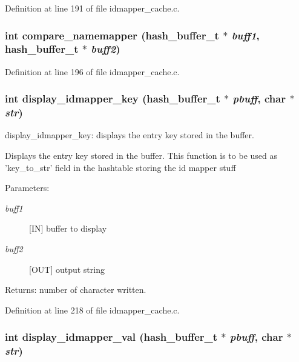 Definition at line 191 of file idmapper\_\-cache.c.
\subsubsection{\setlength{\rightskip}{0pt plus 5cm}int compare\_\-namemapper (hash\_\-buffer\_\-t $\ast$ {\em buff1}, hash\_\-buffer\_\-t $\ast$ {\em buff2})}\label{idmapper__cache_8c_a11}




Definition at line 196 of file idmapper\_\-cache.c.
\subsubsection{\setlength{\rightskip}{0pt plus 5cm}int display\_\-idmapper\_\-key (hash\_\-buffer\_\-t $\ast$ {\em pbuff}, char $\ast$ {\em str})}\label{idmapper__cache_8c_a12}


display\_\-idmapper\_\-key: displays the entry key stored in the buffer.

Displays the entry key stored in the buffer. This function is to be used as 'key\_\-to\_\-str' field in the hashtable storing the id mapper stuff

\begin{Desc}
\item[Parameters:]
\begin{description}
\item[{\em buff1}][IN] buffer to display \item[{\em buff2}][OUT] output string\end{description}
\end{Desc}
\begin{Desc}
\item[Returns:]number of character written. \end{Desc}


Definition at line 218 of file idmapper\_\-cache.c.
\subsubsection{\setlength{\rightskip}{0pt plus 5cm}int display\_\-idmapper\_\-val (hash\_\-buffer\_\-t $\ast$ {\em pbuff}, char $\ast$ {\em str})}\label{idmapper__cache_8c_a13}


